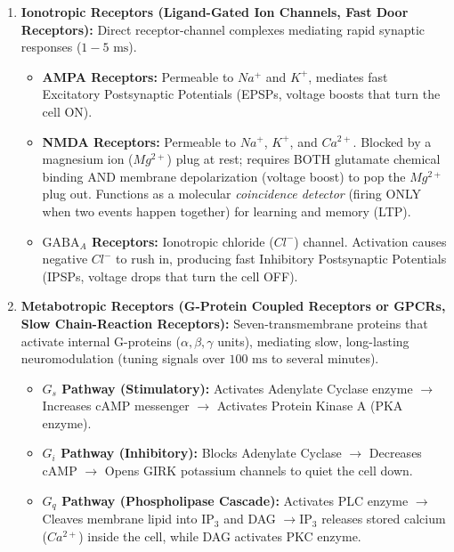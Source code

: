 \documentclass[10pt,journal,compsoc,onecolumn]{IEEEtran}
\begin{document}
\begin{enumerate}
    \item \textbf{Ionotropic Receptors (Ligand-Gated Ion Channels, Fast Door Receptors):}
    Direct receptor-channel complexes mediating rapid synaptic responses ($1-5\text{ ms}$).
    \begin{itemize}
        \item \textbf{AMPA Receptors:} Permeable to $Na^+$ and $K^+$, mediates fast Excitatory Postsynaptic Potentials (EPSPs, voltage boosts that turn the cell ON).
        \item \textbf{NMDA Receptors:} Permeable to $Na^+$, $K^+$, and $Ca^{2+}$. Blocked by a magnesium ion ($Mg^{2+}$) plug at rest; requires BOTH glutamate chemical binding AND membrane depolarization (voltage boost) to pop the $Mg^{2+}$ plug out. Functions as a molecular \emph{coincidence detector} (firing ONLY when two events happen together) for learning and memory (LTP).
        \item \textbf{$\text{GABA}_A$ Receptors:} Ionotropic chloride ($Cl^-$) channel. Activation causes negative $Cl^-$ to rush in, producing fast Inhibitory Postsynaptic Potentials (IPSPs, voltage drops that turn the cell OFF).
    \end{itemize}
    \item \textbf{Metabotropic Receptors (G-Protein Coupled Receptors or GPCRs, Slow Chain-Reaction Receptors):}
    Seven-transmembrane proteins that activate internal G-proteins ($\alpha, \beta, \gamma$ units), mediating slow, long-lasting neuromodulation (tuning signals over $100\text{ ms}$ to several minutes).
    \begin{itemize}
        \item \textbf{$G_s$ Pathway (Stimulatory):} Activates Adenylate Cyclase enzyme $\to$ Increases cAMP messenger $\to$ Activates Protein Kinase A (PKA enzyme).
        \item \textbf{$G_i$ Pathway (Inhibitory):} Blocks Adenylate Cyclase $\to$ Decreases cAMP $\to$ Opens GIRK potassium channels to quiet the cell down.
        \item \textbf{$G_q$ Pathway (Phospholipase Cascade):} Activates PLC enzyme $\to$ Cleaves membrane lipid into $\text{IP}_3$ and DAG $\to \text{IP}_3$ releases stored calcium ($Ca^{2+}$) inside the cell, while DAG activates PKC enzyme.
    \end{itemize}
\end{enumerate}

\end{document}
